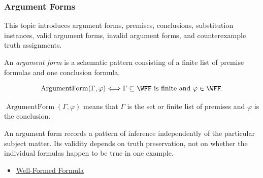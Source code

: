 \subsubsection*{Argument Forms}

\begin{remark*}
This topic introduces argument forms, premises, conclusions, substitution
instances, valid argument forms, invalid argument forms, and counterexample
truth assignments.
\end{remark*}

\begin{tcolorbox}[colback=propbox, colframe=propborder, arc=2pt,
  left=6pt, right=6pt, top=4pt, bottom=4pt,
  title={\small\textbf{Definition (Argument Form)}},
  fonttitle=\small\bfseries]
\begin{definition}
\label{def:argument-form-propositional-logic}
An \emph{argument form} is a schematic pattern consisting of a finite list of
premise formulas and one conclusion formula.
\end{definition}
\end{tcolorbox}

\begin{remark*}
\[
\operatorname{ArgumentForm}(\Gamma,\varphi)
\Longleftrightarrow
\Gamma\subseteq\WFF\text{ is finite and }\varphi\in\WFF.
\]
\end{remark*}

\begin{remark*}
\(\operatorname{ArgumentForm}(\Gamma,\varphi)\) means that \(\Gamma\) is the set
or finite list of premises and \(\varphi\) is the conclusion.
\end{remark*}

\begin{remark*}[Interpretation]
An argument form records a pattern of inference independently of the particular
subject matter. Its validity depends on truth preservation, not on whether the
individual formulas happen to be true in one example.
\end{remark*}

\begin{dependencies}
\begin{itemize}
  \item \hyperref[def:well-formed-formula]{Well-Formed Formula}
\end{itemize}
\end{dependencies}

